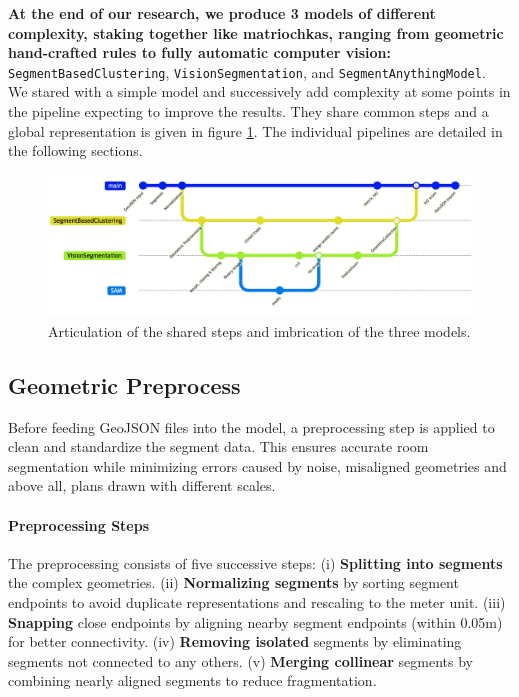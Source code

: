 \documentclass[11pt]{article}
\begin{document}
\textbf{At the end of our research, we produce 3 models of different complexity,
staking together like matriochkas, 
ranging from geometric hand-crafted rules to fully automatic computer vision:}
\texttt{SegmentBasedClustering}, 
\texttt{VisionSegmentation}, 
and \texttt{SegmentAnythingModel}.\\ We stared with a simple model and successively add 
complexity at some points in the pipeline expecting to improve the results. 
They share common steps and a global representation
is given in figure \ref{fig:global_pipeline}. The individual pipelines are detailed 
in the following sections.
\begin{figure}[h]
    \centering
    \includegraphics[width=01\linewidth]{figures/CapstoneGit.png}
    \caption{Articulation of the shared steps and imbrication of the three models.}
    \label{fig:global_pipeline}
\end{figure}

\subsection{Geometric Preprocess}
\label{sec:geometric_preprocess}

Before feeding GeoJSON files into the model, a preprocessing step is applied to 
clean and standardize the segment data. This ensures accurate room segmentation 
while minimizing errors caused by noise, misaligned geometries and above all,
plans drawn with different scales.

\paragraph{Preprocessing Steps}
The preprocessing consists of five successive steps:
(i) \textbf{Splitting into segments} the complex geometries.
(ii) \textbf{Normalizing segments} by sorting segment endpoints to avoid duplicate representations and rescaling to the meter unit.
(iii) \textbf{Snapping} close endpoints by aligning nearby segment endpoints (within 0.05m) for better connectivity.
(iv) \textbf{Removing isolated} segments by eliminating segments not connected to any others.
(v) \textbf{Merging collinear} segments by combining nearly aligned segments to reduce fragmentation.
\end{document}

